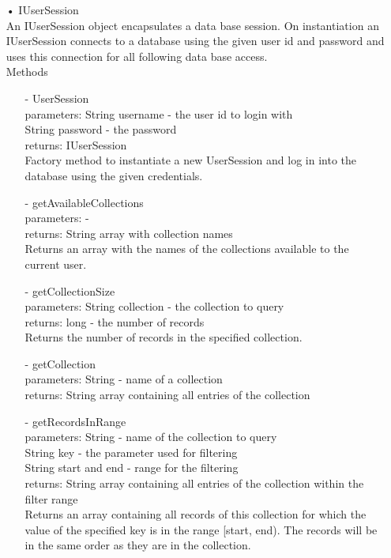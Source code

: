 \documentclass[oneside, english, final]{design}
\begin{document}
\begin{itemize}
	\item[•]IUserSession
		\\An IUserSession object encapsulates a data base session.
		On instantiation an IUserSession connects to a database using
		the given user id and password and uses this connection for
		all following data base access.
	      \\Methods
	      \begin{itemize}
		      \item[-]UserSession
		            \\parameters: String username - the user id to login with
			    \\String password - the password
			    \\returns: IUserSession
		            \\Factory method to instantiate a new UserSession and log in into the database using the given credentials.

		      \item[-]getAvailableCollections
		            \\parameters: -
		            \\returns: String array with collection names
		            \\Returns an array with the names of the collections available to the current user.

		      \item[-]getCollectionSize
		            \\parameters: String collection - the collection to query
		            \\returns: long - the number of records
		            \\Returns the number of records in the specified collection.

		      \item[-]getCollection
		            \\parameters: String - name of a collection
		            \\returns: String array containing all entries of the collection

		      \item[-]getRecordsInRange
		            \\parameters: String - name of the collection to query
		            \\String key - the parameter used for filtering
		            \\String start and end - range for the filtering
		            \\returns: String array containing all entries of the collection within the filter range
			    \\ Returns an array containing all records of this
				collection for which the value of the
				specified key is in the range [start, end).
				The records will be in the same order as
				they are in the collection.


\end{itemize}
\end{itemize}
\end{document}
